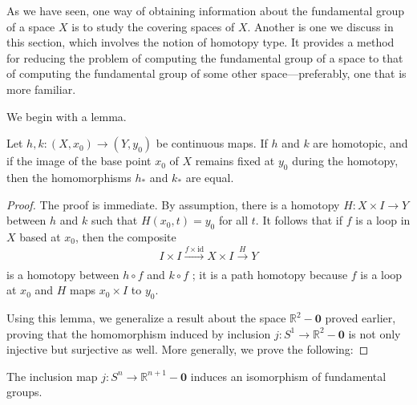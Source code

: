  As we have seen, one way of obtaining information about the fundamental group of a space \(X\) is to study the covering spaces of \(X\). Another is one we discuss in this section, which involves the notion of homotopy type. It provides a method for reducing the problem of computing the fundamental group of a space to that of computing the fundamental group of some other space---preferably, one that is more familiar.

We begin with a lemma.

\begin{lemma}
\label{lem:\thetheorem}
Let \(h,k : ( {X,x_{0}}) \rightarrow ( {Y,y_{0}})\) be continuous maps. If \(h\) and \(k\) are homotopic, and if the image of the base point \(x_{0}\) of \(X\) remains fixed at \(y_{0}\) during the homotopy, then the homomorphisms \(h_{ * }\) and \(k_{ * }\) are equal.
\end{lemma}

\begin{proof}
The proof is immediate. By assumption, there is a homotopy \(H : X \times I \rightarrow Y\) between \(h\) and \(k\) such that \(H( {x_{0},t}) = y_{0}\) for all \(t\). It follows that if \(f\) is a loop in \(X\) based at \(x_{0}\), then the composite
\[
I \times I\xrightarrow[]{f \times \mathrm{{id}}}X \times I\xrightarrow[]{H}Y
\]
is a homotopy between \(h \circ f\) and \(k \circ f\) ; it is a path homotopy because \(f\) is a loop at \(x_{0}\) and \(H\) maps \(x_{0} \times I\) to \(y_{0}\).

Using this lemma, we generalize a result about the space \(\mathbb{R}^{2} - \mathbf{0}\) proved earlier, proving that the homomorphism induced by inclusion \(j : S^{1} \rightarrow {\mathbb{R}}^{2} - \mathbf{0}\) is not only injective but surjective as well. More generally, we prove the following:
\end{proof}
\begin{theorem}
\label{thm:\thetheorem}
The inclusion map \(j : S^{n} \rightarrow {\mathbb{R}}^{n + 1} - \mathbf{0}\) induces an isomorphism of fundamental groups.
\end{theorem}

